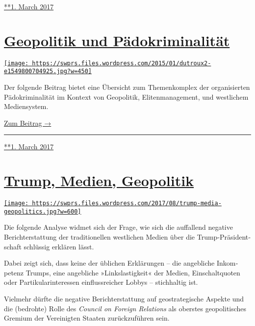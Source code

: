 \href{https://swprs.org/2017/03/01/die-israel-lobby-fakten-und-mythen/}{**1.
March 2017}

\hypertarget{geopolitik-und-puxe4dokriminalituxe4t}{%
\section{\texorpdfstring{\href{https://swprs.org/2017/03/01/geopolitik-paedokriminalitaet/}{Geopolitik
und
Pädokriminalität}}{Geopolitik und Pädokriminalität}}\label{geopolitik-und-puxe4dokriminalituxe4t}}

\href{https://swprs.org/2017/03/01/geopolitik-paedokriminalitaet/}{\texttt{[image: https://swprs.files.wordpress.com/2015/01/dutroux2-e1549800704925.jpg?w=450]}}

Der folgende Beitrag bietet eine Übersicht zum Themen­komplex der
organisierten Pädo­krimi­nalität im Kontext von Geopolitik,
Eliten­ma­na­ge­ment, und westlichem Medien­system.

\href{https://swprs.org/geopolitik-und-paedokriminalitaet/}{Zum Beitrag
→}

\begin{center}\rule{0.5\linewidth}{\linethickness}\end{center}

\href{https://swprs.org/2017/03/01/geopolitik-paedokriminalitaet/}{**1.
March 2017}

\hypertarget{trump-medien-geopolitik}{%
\section{\texorpdfstring{\href{https://swprs.org/2017/03/01/trump-medien-geopolitik/}{Trump,
Medien,
Geopolitik}}{Trump, Medien, Geopolitik}}\label{trump-medien-geopolitik}}

\href{https://swprs.org/2017/03/01/trump-medien-geopolitik/}{\texttt{[image: https://swprs.files.wordpress.com/2017/08/trump-media-geopolitics.jpg?w=600]}}

Die folgende Analyse widmet sich der Frage, wie sich die auf­fallend
negative Bericht­er­stattung der tra­di­tio­nellen west­lichen Medien
über die Trump-Prä­si­dent­schaft schlüssig er­klären lässt.

Dabei zeigt sich, dass keine der übli­chen Er­klä­rungen -- die
angeb­liche In­kom­petenz Trumps, eine an­geb­liche »Links­las­tig­keit«
der Medien, Ein­schalt­quoten oder Par­ti­ku­lar­inte­ressen
ein­fluss­reicher Lobbys -- stich­haltig ist.

Vielmehr dürfte die negative Bericht­erstattung auf geostra­tegische
Aspekte und die (bedrohte) Rolle des \emph{Council on Foreign Relations}
als oberstes geopolitisches Gremium der Vereinigten Staaten
zurück­­zu­führen sein.

